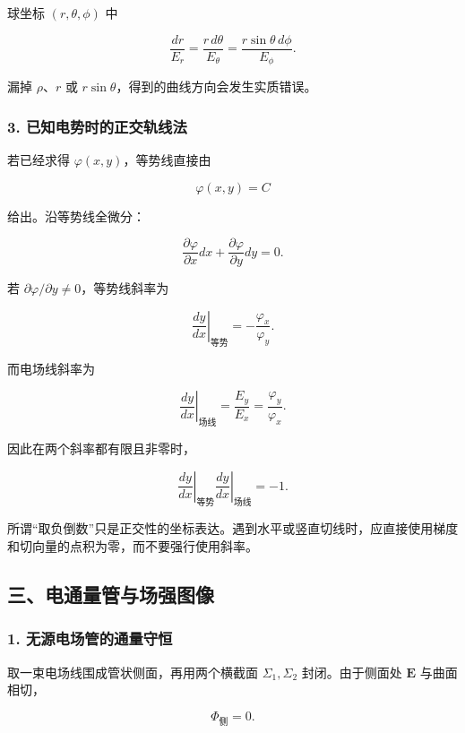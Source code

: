 球坐标 \((r,\theta,\phi)\) 中

\[
\boxed{
\frac{dr}{E_r}
=
\frac{r\,d\theta}{E_{\theta}}
=
\frac{r\sin\theta\,d\phi}{E_{\phi}}
}.
\]

漏掉 \(\rho\)、\(r\) 或 \(r\sin\theta\)，得到的曲线方向会发生实质错误。

\subsubsection{3.
已知电势时的正交轨线法}\label{m2:ux5df2ux77e5ux7535ux52bfux65f6ux7684ux6b63ux4ea4ux8f68ux7ebfux6cd5}

若已经求得 \(\varphi(x,y)\)，等势线直接由

\[
\varphi(x,y)=C
\]

给出。沿等势线全微分：

\[
\frac{\partial\varphi}{\partial x}dx
+\frac{\partial\varphi}{\partial y}dy
=0.
\]

若 \(\partial\varphi/\partial y\neq0\)，等势线斜率为

\[
\left.\frac{dy}{dx}\right|_{\mathrm{\text{等势}}}
=
-\frac{\varphi_x}{\varphi_y}.
\]

而电场线斜率为

\[
\left.\frac{dy}{dx}\right|_{\mathrm{\text{场线}}}
=
\frac{E_y}{E_x}
=
\frac{\varphi_y}{\varphi_x}.
\]

因此在两个斜率都有限且非零时，

\[
\left.\frac{dy}{dx}\right|_{\mathrm{\text{等势}}}
\left.\frac{dy}{dx}\right|_{\mathrm{\text{场线}}}
=-1.
\]

所谓``取负倒数''只是正交性的坐标表达。遇到水平或竖直切线时，应直接使用梯度和切向量的点积为零，而不要强行使用斜率。

\subsection{三、电通量管与场强图像}\label{m2:ux4e09ux7535ux901aux91cfux7ba1ux4e0eux573aux5f3aux56feux50cf}

\subsubsection{1.
无源电场管的通量守恒}\label{m2:ux65e0ux6e90ux7535ux573aux7ba1ux7684ux901aux91cfux5b88ux6052}

取一束电场线围成管状侧面，再用两个横截面 \(\Sigma_1,\Sigma_2\)
封闭。由于侧面处 \(\mathbf E\) 与曲面相切，

\[
\Phi_{\mathrm{\text{侧}}}=0.
\]

